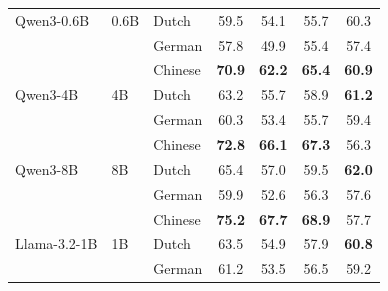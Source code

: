 \documentclass[11pt]{article}
\begin{document}
\begin{table}[!ht]
\begin{tabular}{ll l cccc}
\addlinespace[2pt]
Qwen3-0.6B & 0.6B & Dutch & \cellcolor[rgb]{0.901,1.000,0.901} 59.5 & \cellcolor[rgb]{0.948,1.000,0.948} 54.1 & \cellcolor[rgb]{0.925,1.000,0.925} 55.7 & \cellcolor[rgb]{0.789,1.000,0.789} 60.3 \\
 &  & German & \cellcolor[rgb]{0.919,1.000,0.919} 57.8 & \cellcolor[rgb]{1.000,0.999,0.999} 49.9 & \cellcolor[rgb]{0.929,1.000,0.929} 55.4 & \cellcolor[rgb]{0.849,1.000,0.849} 57.4 \\
 &  & Chinese & \cellcolor[rgb]{0.782,1.000,0.782} \textbf{70.9} & \cellcolor[rgb]{0.846,1.000,0.846} \textbf{62.2} & \cellcolor[rgb]{0.796,1.000,0.796} \textbf{65.4} & \cellcolor[rgb]{0.777,1.000,0.777} \textbf{60.9} \\
\addlinespace[2pt]
Qwen3-4B & 4B & Dutch & \cellcolor[rgb]{0.862,1.000,0.862} 63.2 & \cellcolor[rgb]{0.928,1.000,0.928} 55.7 & \cellcolor[rgb]{0.882,1.000,0.882} 58.9 & \cellcolor[rgb]{0.771,1.000,0.771} \textbf{61.2} \\
 &  & German & \cellcolor[rgb]{0.893,1.000,0.893} 60.3 & \cellcolor[rgb]{0.957,1.000,0.957} 53.4 & \cellcolor[rgb]{0.925,1.000,0.925} 55.7 & \cellcolor[rgb]{0.808,1.000,0.808} 59.4 \\
 &  & Chinese & \cellcolor[rgb]{0.762,1.000,0.762} \textbf{72.8} & \cellcolor[rgb]{0.797,1.000,0.797} \textbf{66.1} & \cellcolor[rgb]{0.771,1.000,0.771} \textbf{67.3} & \cellcolor[rgb]{0.871,1.000,0.871} 56.3 \\
\addlinespace[2pt]
Qwen3-8B & 8B & Dutch & \cellcolor[rgb]{0.839,1.000,0.839} 65.4 & \cellcolor[rgb]{0.912,1.000,0.912} 57.0 & \cellcolor[rgb]{0.874,1.000,0.874} 59.5 & \cellcolor[rgb]{0.755,1.000,0.755} \textbf{62.0} \\
 &  & German & \cellcolor[rgb]{0.897,1.000,0.897} 59.9 & \cellcolor[rgb]{0.967,1.000,0.967} 52.6 & \cellcolor[rgb]{0.917,1.000,0.917} 56.3 & \cellcolor[rgb]{0.845,1.000,0.845} 57.6 \\
 &  & Chinese & \cellcolor[rgb]{0.737,1.000,0.737} \textbf{75.2} & \cellcolor[rgb]{0.777,1.000,0.777} \textbf{67.7} & \cellcolor[rgb]{0.750,1.000,0.750} \textbf{68.9} & \cellcolor[rgb]{0.843,1.000,0.843} 57.7 \\
\addlinespace[2pt]
Llama-3.2-1B & 1B & Dutch & \cellcolor[rgb]{0.859,1.000,0.859} 63.5 & \cellcolor[rgb]{0.938,1.000,0.938} 54.9 & \cellcolor[rgb]{0.895,1.000,0.895} 57.9 & \cellcolor[rgb]{0.779,1.000,0.779} \textbf{60.8} \\
 &  & German & \cellcolor[rgb]{0.883,1.000,0.883} 61.2 & \cellcolor[rgb]{0.956,1.000,0.956} 53.5 & \cellcolor[rgb]{0.914,1.000,0.914} 56.5 & \cellcolor[rgb]{0.812,1.000,0.812} 59.2 \\

\end{tabular}
\end{table}
\end{document}
